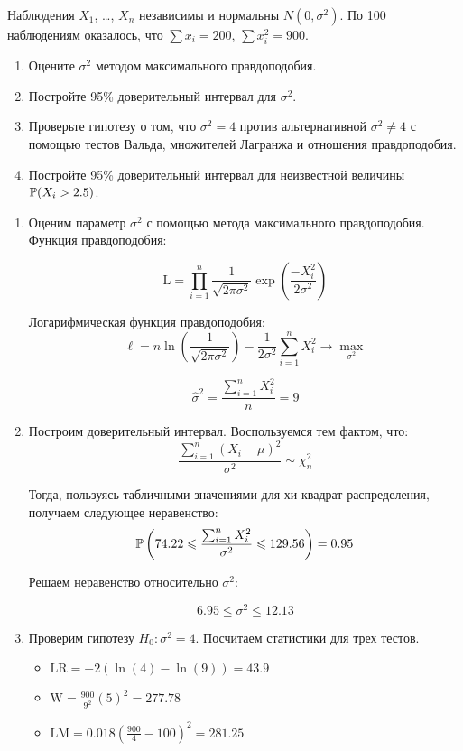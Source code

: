 \begin{problem}
Наблюдения $X_1$, \ldots, $X_n$ независимы и нормальны $N(0,\sigma^2)$. По 100 наблюдениям оказалось, что $\sum x_i=200$, $\sum x_i^2=900$.
\begin{enumerate}
\item Оцените $\sigma^2$ методом максимального правдоподобия.
\item Постройте 95\% доверительный интервал для $\sigma^2$.
\item Проверьте гипотезу о том, что $\sigma^2=4$ против альтернативной $\sigma^2\neq 4$ с помощью тестов Вальда, множителей Лагранжа и отношения правдоподобия.
\item Постройте 95\% доверительный интервал для неизвестной величины $\P(X_i>2.5)$.
\end{enumerate}


\begin{sol}
\begin{enumerate}
\item Оценим параметр $\sigma^2$ с помощью метода максимального правдоподобия. Функция правдоподобия:

\[\text{L} = \prod_{i=1}^{n} \frac{1}{\sqrt{2\pi\sigma^2}}\exp\left( \frac{- X_i ^2}{2\sigma^2}\right) \]

Логарифмическая функция правдоподобия:
\[
\ell = n \ln \left( \frac{1}{\sqrt{2\pi\sigma^2}}\right) - \frac{1}{2\sigma^2}\sum_{i=1}^{n}X_i^2 \to \max_{\sigma^2}
\]

\[\hat{\sigma}^2 = \frac{\sum_{i=1}^{n}X_i^2}{n} = 9\]

\item Построим доверительный интервал. Воспользуемся тем фактом, что:
\[\frac{\sum_{i=1}^{n}(X_i - \mu)^2}{\sigma^2} \sim \chi^2_n\]

Тогда, пользуясь табличными значениями для хи-квадрат распределения, получаем следующее неравенство:
\[\P\left( 74.22 \leqslant \frac{\sum_{i=1}^{n}X_i^2}{\sigma^2} \leqslant 129.56 \right) = 0.95 \]

Решаем неравенство относительно $\sigma^2$:

\[6.95 \leqslant \sigma^2 \leqslant 12.13\]

\item Проверим гипотезу $H_0: \sigma^2 = 4$. Посчитаем статистики для трех тестов.
\begin{itemize}
  \item $\text{LR} = -2\left(\ln(4) - \ln(9)\right) = 43.9$
    \item $\text{W} = \frac{900}{9^2}(5)^2 = 277.78$
    \item $\text{LM} = 0.018\left( \frac{900}{4}-100\right)^2 = 281.25$
\end{itemize}


\end{enumerate}
\end{sol}
\end{problem}
